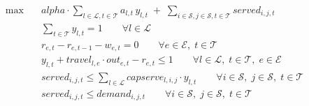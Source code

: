 \begin{align}
  \max\quad & \mathit{alpha} \cdot \sum_{l \in \mathcal{L}, t \in \mathcal{T}} a_{l,t} \, y_{l,t} \; + \; \sum_{i \in \mathcal{S}, j \in \mathcal{S}, t \in \mathcal{T}} served_{i,j,t} \tag{total\_resilience} \\
  & \sum_{t \in \mathcal{T}} y_{l,t} = 1 \qquad \forall l \in \mathcal{L} \tag{train\_one\_time} \\
  & r_{e,t} - r_{e,t-1} - w_{e,t} = 0 \qquad \forall e \in \mathcal{E},\; t \in \mathcal{T} \tag{edge\_cumulative} \\
  & y_{l,t} + travel_{l,e} \cdot out_{e,t} - r_{e,t} \le 1 \qquad \forall l \in \mathcal{L},\; t \in \mathcal{T},\; e \in \mathcal{E} \tag{edge\_availability} \\
  & served_{i,j,t} \le \sum_{l \in \mathcal{L}} capserve_{l,i,j} \cdot y_{l,t} \qquad \forall i \in \mathcal{S},\; j \in \mathcal{S},\; t \in \mathcal{T} \tag{demand\_capacity} \\
  & served_{i,j,t} \le demand_{i,j,t} \qquad \forall i \in \mathcal{S},\; j \in \mathcal{S},\; t \in \mathcal{T} \tag{demand\_limit}
\end{align}